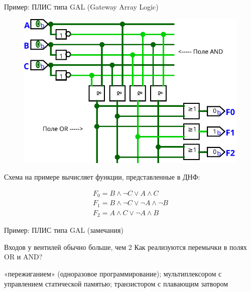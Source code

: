 \documentclass[xetex,aspectratio=43]{beamer}
\begin{document}
\begin{frame}{Пример: ПЛИС типа GAL (Gateway Array Logic)}
    \begin{figure}
        \includegraphics[height=0.5\textheight]{img/09.PLD.pdf}
    \end{figure}
    Схема на примере вычисляет функции, представленные в ДНФ:

    \begin{eqnarray*}
    F_0 = B \wedge\neg C \vee A\wedge C\ \\
    F_1 = B \wedge\neg C \vee \neg A \wedge \neg B \\
    F_2 = A\wedge C \vee \neg A \wedge B
    \end{eqnarray*}
\end{frame}

\begin{frame}{Пример: ПЛИС типа GAL (замечания)}
    \begin{outline}[itemize]
        \1 Входов у вентилей обычно больше, чем 2
        \1 Как реализуются перемычки в полях OR и AND?

        \2 «пережиганием» (одноразовое программирование); мультиплексором с управлением статической памятью; транзистором с плавающим затвором
    \end{outline}
\end{frame}
\end{document}
